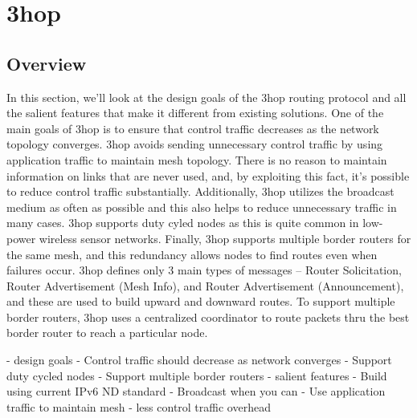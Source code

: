 \section{3hop}

\subsection{Overview}
In this section, we'll look at the design goals of the 3hop routing protocol and all the salient features that make it different from existing solutions. 
One of the main goals of 3hop is to ensure that control traffic decreases as the network topology converges. 
3hop avoids sending unnecessary control traffic by using application traffic to maintain mesh topology. 
There is no reason to maintain information on links that are never used, and, by exploiting this fact, it's possible to reduce control traffic substantially. 
Additionally, 3hop utilizes the broadcast medium as often as possible and this also helps to reduce unnecessary traffic in many cases.
3hop supports duty cyled nodes as this is quite common in low-power wireless sensor networks.
Finally, 3hop supports multiple border routers for the same mesh, and this redundancy allows nodes to find routes even when failures occur.
3hop defines only 3 main types of messages -- Router Solicitation, Router Advertisement (Mesh Info), and Router Advertisement (Announcement), and these are used to build upward and downward routes.
To support multiple border routers, 3hop uses a centralized coordinator to route packets thru the best border router to reach a particular node.

- design goals
    - Control traffic should decrease as network converges
    - Support duty cycled nodes
    - Support multiple border routers
- salient features
    - Build using current IPv6 ND standard
    - Broadcast when you can
    - Use application traffic to maintain mesh
    - less control traffic overhead
\fi

